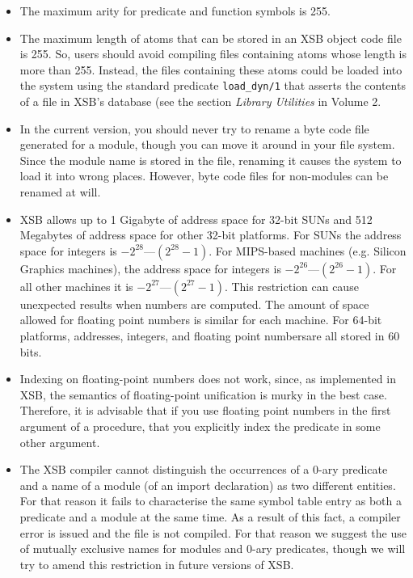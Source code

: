 \begin{itemize}
\item	The maximum arity for predicate and function symbols is 255.
%
\item	The maximum length of atoms that can be stored in an XSB
	object code file is  255.  So, users should avoid compiling
	files 
      containing atoms whose length is more than 255.  Instead, the
      files containing these atoms could be loaded into the system
      using the standard predicate {\tt load\_dyn/1} that asserts the
      contents of a file in XSB's database (see the section {\em
	Library Utilities} in Volume 2.  
%
\item	In the current version, you should never try to rename a byte code 
      file generated for a module, though you can move it around in your 
      file system.  Since the module name is stored in the file, renaming it
      causes the system to load it into wrong places.  However, byte code 
      files for non-modules can be renamed at will.
%
\item XSB allows up to 1 Gigabyte of address space for 32-bit SUNs and 512
      Megabytes of address space for other 32-bit platforms.  For SUNs the
      address space for integers is $-2^{28}$---$(2^{28}-1)$.  For
      MIPS-based machines (e.g. Silicon Graphics machines), the
      address space for integers is $-2^{26}$---$(2^{26}-1)$.  For all
      other machines it is $-2^{27}$---$(2^{27}-1)$.  This restriction can
      cause unexpected results when numbers are computed.  The amount
      of space allowed for floating point numbers is similar for each
      machine.  For 64-bit platforms, addresses, integers, and
	floating point numbersare all stored in 60 bits.
%
\item	Indexing on floating-point numbers does not work, since, as
implemented in XSB, the semantics
      of floating-point unification is murky in the best case. Therefore, it
      is advisable that if you use floating point numbers in the first 
      argument of a procedure,  that you explicitly index the
      predicate in some other argument.
%
\item	The XSB compiler cannot distinguish the occurrences of a
      0-ary predicate and a name of a module (of an import declaration) as
      two different entities.  For that reason it fails to characterise the
      same symbol table entry as both a predicate and a module at the
      same time.  As a result of this fact, a compiler error is issued
      and the file is not compiled.  For that reason we suggest the
      use of mutually exclusive names for modules and 0-ary predicates,
      though we will try to amend this restriction in future versions of
      XSB.
\end{itemize}

